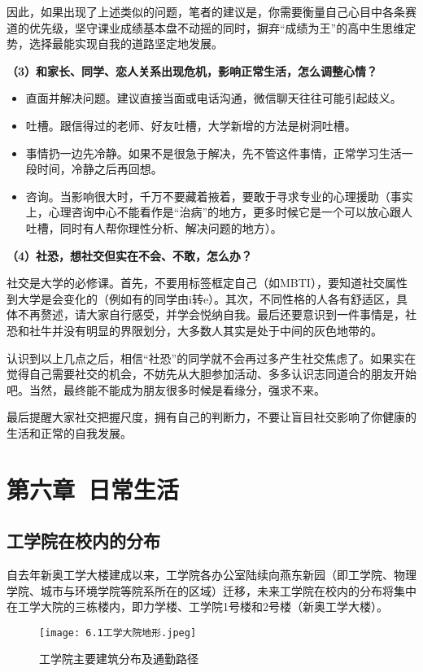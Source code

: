 \documentclass[11pt,oneside]{book}
\begin{document}
因此，如果出现了上述类似的问题，笔者的建议是，你需要衡量自己心目中各条赛道的优先级，坚守课业成绩基本盘不动摇的同时，摒弃“成绩为王”的高中生思维定势，选择最能实现自我的道路坚定地发展。

\textbf{（3）和家长、同学、恋人关系出现危机，影响正常生活，怎么调整心情？}

\begin{itemize}
    \item 直面并解决问题。建议直接当面或电话沟通，微信聊天往往可能引起歧义。
    \item 吐槽。跟信得过的老师、好友吐槽，大学新增的方法是树洞吐槽。
    \item 事情扔一边先冷静。如果不是很急于解决，先不管这件事情，正常学习生活一段时间，冷静之后再回想。
    \item 咨询。当影响很大时，千万不要藏着掖着，要敢于寻求专业的心理援助（事实上，心理咨询中心不能看作是“治病”的地方，更多时候它是一个可以放心跟人吐槽，同时有人帮你理性分析、解决问题的地方）。
\end{itemize}

\textbf{（4）社恐，想社交但实在不会、不敢，怎么办？}

社交是大学的必修课。首先，不要用标签框定自己（如MBTI），要知道社交属性到大学是会变化的（例如有的同学由i转e）。其次，不同性格的人各有舒适区，具体不再赘述，请大家自行感受，并学会悦纳自我。最后还要意识到一件事情是，社恐和社牛并没有明显的界限划分，大多数人其实是处于中间的灰色地带的。

认识到以上几点之后，相信“社恐”的同学就不会再过多产生社交焦虑了。如果实在觉得自己需要社交的机会，不妨先从大胆参加活动、多多认识志同道合的朋友开始吧。当然，最终能不能成为朋友很多时候是看缘分，强求不来。

最后提醒大家社交把握尺度，拥有自己的判断力，不要让盲目社交影响了你健康的生活和正常的自我发展。

\chapter{第六章\ 日常生活}

\section{工学院在校内的分布}
自去年新奥工学大楼建成以来，工学院各办公室陆续向燕东新园（即工学院、物理学院、城市与环境学院等院系所在的区域）迁移，未来工学院在校内的分布将集中在工学大院的三栋楼内，即力学楼、工学院1号楼和2号楼（新奥工学大楼）。

\begin{figure}[htbp]
    \centering
    \texttt{[image: 6.1工学大院地形.jpeg]}
    \renewcommand{\figurename}{图}
    \caption{工学院主要建筑分布及通勤路径}
    \label{fig:enter-label}
\end{figure}
\end{document}
